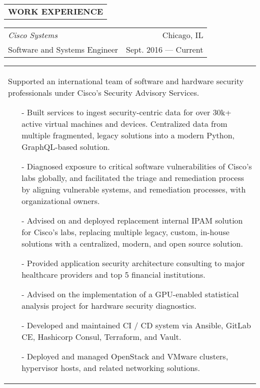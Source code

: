 \begin{tabularx}{\textwidth}{L}
    \textbf{WORK EXPERIENCE}
\end{tabularx}

\begin{tabularx}{\textwidth}{L R}
    \normalsize\textit{Cisco Systems} & Chicago, IL \\
    \hspace{10pt}Software and Systems Engineer & Sept. 2016 --- Current \\
\end{tabularx}
\begin{tabularx}{\textwidth}{X}
    \vspace{1pt}
    Supported an international team of software and hardware security professionals under Cisco's Security Advisory Services.
    \begin{itemize}
        \itemsep{}
        \item[-] Built services to ingest security-centric data for over 30k+ active virtual machines and devices. Centralized data from multiple fragmented, legacy solutions into a modern Python, GraphQL-based solution.
        \item[-] Diagnosed exposure to critical software vulnerabilities of Cisco's labs globally, and facilitated the triage and remediation process by aligning vulnerable systems, and remediation processes, with organizational owners.
        \item[-] Advised on and deployed replacement internal IPAM solution for Cisco's labs, replacing multiple legacy, custom, in-house solutions with a centralized, modern, and open source solution.
        \item[-] Provided application security architecture consulting to major healthcare providers and top 5 financial institutions.
        \item[-] Advised on the implementation of a GPU-enabled statistical analysis project for hardware security diagnostics.
        \item[-] Developed and maintained CI / CD system via Ansible, GitLab CE, Hashicorp Consul, Terraform, and Vault.
        \item[-] Deployed and managed OpenStack and VMware clusters, hypervisor hosts, and related networking solutions.
    \end{itemize}
\end{tabularx}

